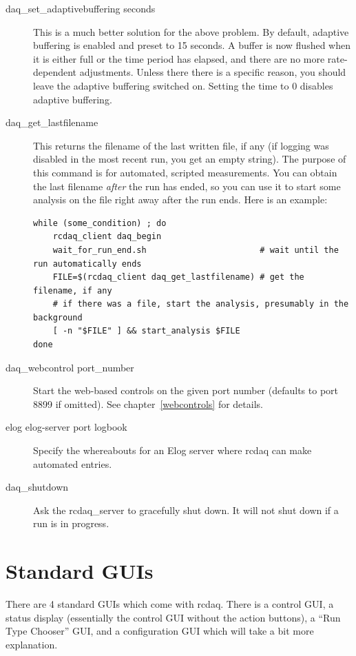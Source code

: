 \documentclass{article}[11pt]
\begin{document}
\begin{description}
\item[daq\_set\_adaptivebuffering seconds] This is a much better
  solution for the above problem. By default, adaptive buffering is
  enabled and preset to 15 seconds.  A buffer is now flushed when it
  is either full or the time period has elapsed, and there are no more
  rate-dependent adjustments. Unless there there is a specific reason,
  you should leave the adaptive buffering switched on. Setting the
  time to 0 disables adaptive buffering.

\item[daq\_get\_lastfilename] This returns the filename of the last
  written file, if any (if logging was disabled in the most recent
  run, you get an empty string). The purpose of this command is for
  automated, scripted measurements. You can obtain the last filename
  \emph{after} the run has ended, so you can use it to start some
  analysis on the file right away after the run ends. Here is an example:

\begin{verbatim}
while (some_condition) ; do 
    rcdaq_client daq_begin
    wait_for_run_end.sh                       # wait until the run automatically ends 
    FILE=$(rcdaq_client daq_get_lastfilename) # get the filename, if any 
    # if there was a file, start the analysis, presumably in the background
    [ -n "$FILE" ] && start_analysis $FILE
done
\end{verbatim}
  
\item[daq\_webcontrol port\_number ] Start the web-based controls on
  the given port number (defaults to port 8899 if omitted). See
  chapter~\ref{webcontrols} for details.

\item[elog elog-server port logbook] Specify the whereabouts for an
  Elog server where rcdaq can make automated entries. 

\item[daq\_shutdown] Ask the rcdaq\_server to gracefully shut
  down.  It will not shut down if a run is in progress.

\end{description}

\section{Standard GUIs}
\label{GUI}
There are 4 standard GUIs which come with rcdaq. There is a control
GUI, a status display (essentially the control GUI without the action
buttons), a ``Run Type Chooser'' GUI, and a configuration GUI which
will take a bit more explanation. 
\end{document}
